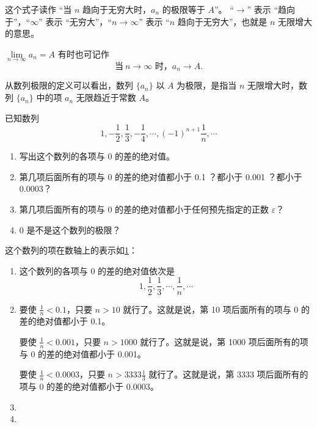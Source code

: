 这个式子读作 “当 $n$ 趋向于无穷大时，$a_n$ 的极限等于 $A$”。
“$\to$” 表示 “趋向于”，“$\infty$” 表示 “无穷大”，“$n\to\infty$” 表示 “$n$ 趋向于无穷大”，也就是 $n$ 无限增大的意思。

$\lim\limits_{n\to\infty}a_n=A$ 有时也可记作
\[ \text{当}\ n\to\infty\text{ 时，} a_n\to A.\]

从数列极限的定义可以看出，数列 $\{a_n\}$ 以 $A$ 为极限，是指当 $n$ 无限增大时，数列 $\{a_n\}$ 中的项 $a_n$ 无限趋近于常数 $A$。
\begin{example}
  已知数列
  \[1,-\frac{1}{2},\frac{1}{3},-\frac{1}{4},\cdots,(-1)^{n+1}\frac{1}{n},\cdots\]
  \begin{enumerate}
    \item 写出这个数列的各项与 0 的差的绝对值。
    \item 第几项后面所有的项与 0 的差的绝对值都小于 0.1 ？都小于 0.001 ？都小于 0.0003？
    \item 第几项后面所有的项与 0 的差的绝对值都小于任何预先指定的正数 $\varepsilon$？
    \item 0 是不是这个数列的极限？
  \end{enumerate}
\end{example}
\begin{solution}
  这个数列的项在数轴上的表示如\cref{fig:1-2}：
  \begin{figure}
    \caption{}\label{fig:1-2}
  \end{figure}
  \begin{enumerate}
    \item 这个数列的各项与 0 的差的绝对值依次是
    \[ 1,\frac{1}{2},\frac{1}{3},\cdots,\frac{1}{n},\cdots\]
    \item 要使 $\frac{1}{n}<0.1$，只要 $n>10$ 就行了。这就是说，第 10 项后面所有的项与 0 的差的绝对值都小于 0.1。
    
    要使 $\frac{1}{n}<0.001$，只要 $n>1000$ 就行了。这就是说，第 1000 项后面所有的项与 0 的差的绝对值都小于 0.001。

    要使 $\frac{1}{n}<0.0003$，只要 $n>3333\frac{1}{3}$ 就行了。这就是说，第 3333 项后面所有的项与 0 的差的绝对值都小于 0.0003。
    \item 
    \item 
  \end{enumerate}
\end{solution}
\begin{Practice}
  \begin{question}
    \item 
    \item 
  \end{question}
\end{Practice}
